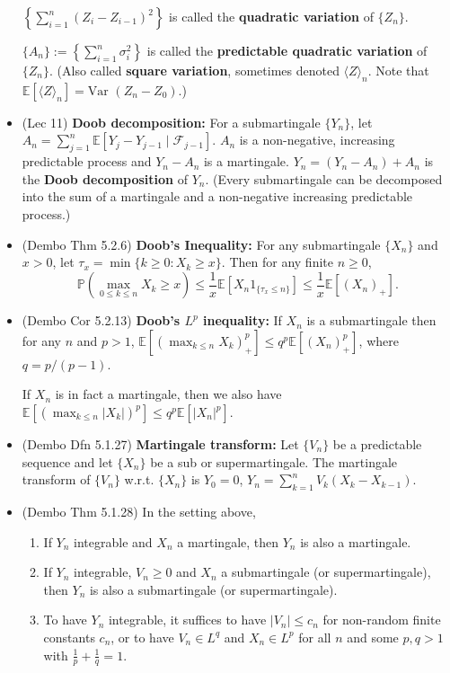 \documentclass[twoside]{article}
\newcommand{\dis}{\displaystyle}
\newcommand\bbE{\mathbb{E}}
\newcommand\bbP{\mathbb{P}}
\newcommand\calF{\mathcal{F}}
\newcommand\sg{\sigma}
\newcommand\var{\text{Var }}
\begin{document}
\begin{itemize}
$\left\{ \displaystyle\sum_{i=1}^n (Z_i - Z_{i-1})^2 \right\}$ is called the \textbf{quadratic variation} of $\{ Z_n \}$.

$\{ A_n \} := \left\{ \displaystyle\sum_{i=1}^n \sg_i^2 \right\}$ is called the \textbf{predictable quadratic variation} of $\{ Z_n \}$. (Also called \textbf{square variation}, sometimes denoted $\langle Z\rangle_n$. Note that $\bbE [\langle Z\rangle_n] = \var (Z_n - Z_0)$.)

\item (Lec 11) \textbf{Doob decomposition:} For a submartingale $\{ Y_n \}$, let $A_n = \dis\sum_{j=1}^n \bbE [Y_j - Y_{j-1} \mid \calF_{j-1}]$. $A_n$ is a non-negative, increasing predictable process and $Y_n - A_n$ is a martingale. $Y_n = (Y_n - A_n) + A_n$ is the \textbf{Doob decomposition} of $Y_n$. (Every submartingale can be decomposed into the sum of a martingale and a non-negative increasing predictable process.)

\item (Dembo Thm 5.2.6) \textbf{Doob's Inequality:} For any submartingale $\{X_n\}$ and $x > 0$, let $\tau_x = \min\{k \geq 0: X_k \geq x\}$. Then for any finite $n \geq 0$,
\[ \bbP \left( \max_{0 \leq k \leq n} X_k \geq x \right)  \leq \frac{1}{x} \bbE \left[ X_n 1_{\{ \tau_x \leq n\}} \right] \leq \frac{1}{x}\bbE [(X_n)_+]. \] 

\item (Dembo Cor 5.2.13) \textbf{Doob's $L^p$ inequality:} If $X_n$ is a submartingale then for any $n$ and $p > 1$, $\bbE \left[\left(\dis\max_{k \leq n} X_k \right)_+^p \right] \leq q^p \bbE [(X_n)_+^p]$, where $q = p/(p-1)$.

If $X_n$ is in fact a martingale, then we also have $\bbE \left[ \left(\dis\max_{k \leq n} |X_k| \right)^p \right] \leq q^p \bbE [|X_n|^p]$.

\item (Dembo Dfn 5.1.27) \textbf{Martingale transform:} Let $\{V_n\}$ be a predictable sequence and let $\{X_n\}$ be a sub or supermartingale. The martingale transform of $\{V_n\}$ w.r.t. $\{X_n\}$ is $Y_0 = 0$, $Y_n = \dis\sum_{k=1}^n V_k(X_k - X_{k-1})$.

\item (Dembo Thm 5.1.28) In the setting above,
\begin{enumerate}
\item If $Y_n$ integrable and $X_n$ a martingale, then $Y_n$ is also a martingale.
\item If $Y_n$ integrable, $V_n \geq 0$ and $X_n$ a submartingale (or supermartingale), then $Y_n$ is also a submartingale (or supermartingale).
\item To have $Y_n$ integrable, it suffices to have $|V_n|\leq c_n$ for non-random finite constants $c_n$, or to have $V_n \in L^q$ and $X_n \in L^p$ for all $n$ and some $p,q > 1$ with $\frac{1}{p} + \frac{1}{q} = 1$.
\end{enumerate}

\end{itemize}
\end{document}
